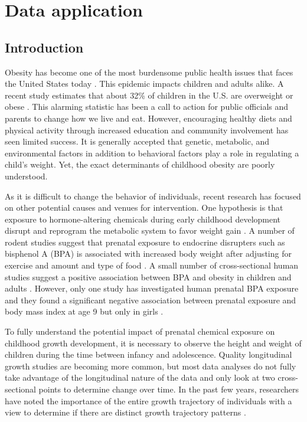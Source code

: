 \chapter{Data application}
\label{chap:data}
\section{Introduction}
Obesity has become one of the most burdensome public health issues that faces the United States today \cite{surgeon2001}.  This epidemic impacts children and adults alike.  A recent study estimates that about 32\% of children in the U.S. are overweight or obese \cite{ogden2008}. This alarming statistic has been a call to action for public officials and parents to change how we live and eat. However, encouraging healthy diets and physical activity through increased education and community involvement has seen limited success.  It is generally accepted that genetic, metabolic, and environmental factors in addition to behavioral factors play a role in regulating a child's weight. Yet, the exact determinants of childhood obesity are poorly understood.

As it is difficult to change the behavior of individuals, recent research has focused on other potential causes and venues for intervention. One hypothesis is that exposure to hormone-altering chemicals during early childhood development disrupt and reprogram the metabolic system to favor weight gain \cite{tuma2007}. A number of rodent studies suggest that prenatal exposure to endocrine disrupters such as bisphenol A (BPA) is associated with increased body weight after adjusting for exercise and amount and type of food \cite{rubin2001,akingbemi2004,hiyama2011, howdeshell1999,miyawaki2007,somm2009,wei2011,xu2011}. A small number of cross-sectional human studies suggest a positive association between BPA and obesity in children and adults \cite{carwile2011,shankar2012,trasande2012}. However, only one study has investigated human prenatal BPA exposure and they found a significant negative association between prenatal exposure and body mass index at age 9 but only in girls \cite{harley2013}.
 
 To fully understand the potential impact of prenatal chemical exposure on childhood growth development, it is necessary to observe the height and weight of children during the time between infancy and adolescence. Quality longitudinal growth studies are becoming more common, but most data analyses do not fully take advantage of the longitudinal nature of the data and only look at two cross-sectional points to determine change over time. In the past few years, researchers have noted the importance of the entire growth trajectory of individuals with a view to determine if there are distinct growth trajectory patterns \cite{pryor2011,carter2012,li2007,garden2012}. 

